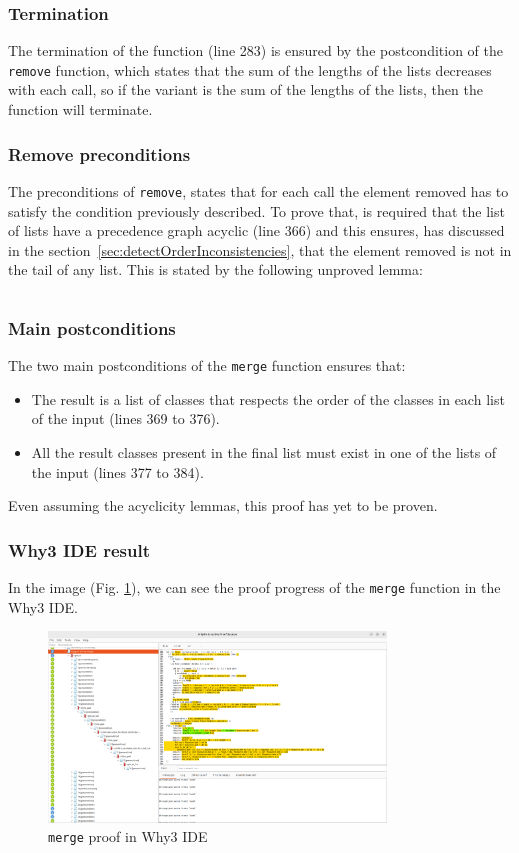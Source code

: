 \documentclass[runningheads]{llncs}
\begin{document}
\subsubsection{Termination}
The termination of the function (line 283) is ensured by the postcondition of the \texttt{remove} function, which states that the sum of the lengths of the lists decreases with each call, so if the variant is the sum of the lengths of the lists, then the function will terminate.
\subsubsection{Remove preconditions}
The preconditions of \texttt{remove}, states that for each call the element removed has to satisfy the condition previously described.
To prove that, is required that the list of lists have a precedence graph acyclic (line 366) and this ensures, has discussed in the section~\ref{sec:detectOrderInconsistencies}, 
that the element removed is not in the tail of any list. This is stated by the following unproved lemma:
\inputminted[firstline=198,lastline=203,fontsize=\small,linenos,xleftmargin=20pt]{ocaml}{../c3/cameleer/c3.ml}
\subsubsection{Main postconditions}
The two main postconditions of the \texttt{merge} function ensures that:
\begin{itemize}
  \item The result is a list of classes that respects the order of the classes in each list of the input (lines 369 to 376).
  \item All the result classes present in the final list must exist in one of the lists of the input (lines 377 to 384).
\end{itemize}
Even assuming the acyclicity lemmas, this proof has yet to be proven.
\subsubsection{Why3 IDE result}
In the image (Fig. \ref{fig:Why3Merge}), we can see the proof progress of the \texttt{merge} function in the Why3 IDE.
\begin{figure}[htbp]
  \centering
  \includegraphics[width=0.8\textwidth]{images/Why3merge.png}
  \caption{\texttt{merge} proof in Why3 IDE}
  \label{fig:Why3Merge}
\end{figure}
\end{document}
